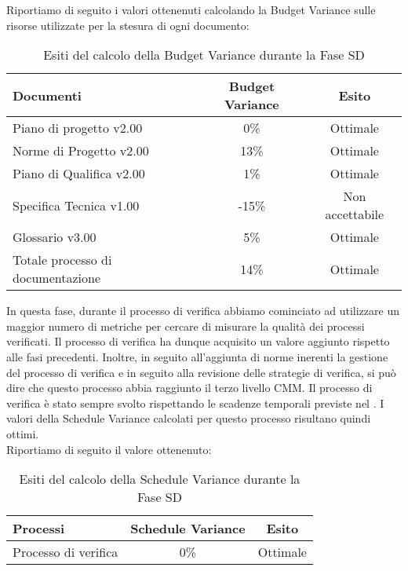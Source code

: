 			Riportiamo di seguito i valori ottenenuti calcolando la Budget Variance sulle risorse utilizzate per la stesura di ogni documento:
			\begin{table}[H]
					\centering
					\begin{tabu}{| l | c | c |}
							\hline
							Documenti 							& Budget Variance	& Esito		\\ \hline \hline
							
							Piano di progetto v2.00				& 0\% 		& Ottimale  \\ \hline
							Norme di Progetto v2.00 			& 13\%		& Ottimale  \\ \hline
							Piano di Qualifica v2.00 			& 1\%		& Ottimale  \\ \hline
							Specifica Tecnica v1.00 			& -15\%		& Non accettabile  \\ \hline
							Glossario v3.00					 	& 5\% 		& Ottimale  \\ \hline
							Totale processo di documentazione & 14\% & Ottimale \\ \hline
						\end{tabu}
					\caption{Esiti del calcolo della Budget Variance durante la Fase SD}
				\end{table}

			In questa fase, durante il processo di verifica abbiamo cominciato ad utilizzare un maggior numero di metriche per cercare di misurare la qualità dei processi verificati. Il processo di verifica ha dunque acquisito un valore aggiunto rispetto alle fasi precedenti. Inoltre, in seguito all'aggiunta di norme inerenti la gestione del processo di verifica e in seguito alla revisione delle strategie di verifica, si può dire che questo processo abbia raggiunto il terzo livello CMM. 
			Il processo di verifica è stato sempre svolto rispettando le scadenze temporali previste nel . I valori della Schedule Variance calcolati per questo processo risultano quindi ottimi.\\
			Riportiamo di seguito il valore ottenenuto:
			\begin{table}[H]
					\centering
					\begin{tabu}{| l | c | c |}
							\hline
							Processi 							& Schedule Variance	& Esito		\\ \hline \hline
							Processo di verifica & 0\% & Ottimale \\ \hline
						\end{tabu}
					\caption{Esiti del calcolo della Schedule Variance durante la Fase SD}
				\end{table}	

